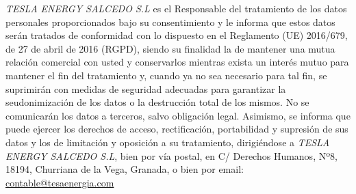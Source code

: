 
\vspace{1cm}
\small
\textit{TESLA ENERGY SALCEDO S.L} es el Responsable del tratamiento de los datos personales proporcionados bajo su consentimiento y le informa que estos datos serán tratados de conformidad con lo dispuesto en el Reglamento (UE) 2016/679, de 27 de abril de 2016 (RGPD), siendo su finalidad la de mantener una mutua relación comercial con usted y conservarlos mientras exista un interés mutuo para mantener el fin del tratamiento y, cuando ya no sea necesario para tal fin, se suprimirán con medidas de seguridad adecuadas para garantizar la seudonimización de los datos o la destrucción total de los mismos. No se comunicarán los datos a terceros, salvo obligación legal. Asimismo, se informa que puede ejercer los derechos de acceso, rectificación, portabilidad y supresión de sus datos y los de limitación y oposición a su tratamiento, dirigiéndose a \textit{TESLA ENERGY SALCEDO S.L}, bien por vía postal, en C/ Derechos Humanos, Nº8, 18194, Churriana de la Vega, Granada, o bien por email: \underline{contable@tesaenergia.com}